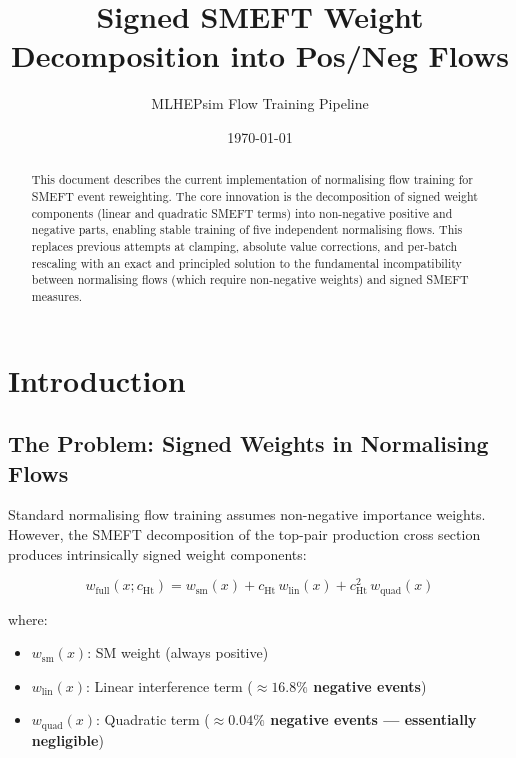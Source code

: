 \documentclass[11pt,a4paper]{article}
\title{Signed SMEFT Weight Decomposition into Pos/Neg Flows}
\author{MLHEPsim Flow Training Pipeline}
\date{\today}
\begin{document}
\maketitle

\begin{abstract}
This document describes the current implementation of normalising flow training for SMEFT event reweighting.
The core innovation is the decomposition of signed weight components (linear and quadratic SMEFT terms) into 
non-negative positive and negative parts, enabling stable training of five independent normalising flows.
This replaces previous attempts at clamping, absolute value corrections, and per-batch rescaling with an 
exact and principled solution to the fundamental incompatibility between normalising flows (which require 
non-negative weights) and signed SMEFT measures.
\end{abstract}

\section{Introduction}

\subsection{The Problem: Signed Weights in Normalising Flows}

Standard normalising flow training assumes non-negative importance weights. However, the SMEFT decomposition 
of the top-pair production cross section produces intrinsically signed weight components:

\begin{equation}
w_{\text{full}}(x; c_{\text{Ht}}) = w_{\text{sm}}(x) + c_{\text{Ht}} \, w_{\text{lin}}(x) + c_{\text{Ht}}^2 \, w_{\text{quad}}(x)
\end{equation}

where:
\begin{itemize}
  \item $w_{\text{sm}}(x)$: SM weight (always positive)
  \item $w_{\text{lin}}(x)$: Linear interference term (\textbf{$\approx 16.8\%$ negative events})
  \item $w_{\text{quad}}(x)$: Quadratic term (\textbf{$\approx 0.04\%$ negative events — essentially negligible})
\end{itemize}
\end{document}
